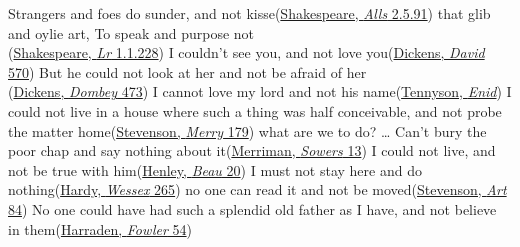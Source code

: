 \ea\label{ex:positive}
 \ea Strangers and foes do sunder, and not kisse\hfill(\href{https://internetshakespeare.uvic.ca/doc/AWW_F1/scene/2.5/index.html#tln-1360}{Shakespeare, \textit{Alls} 2.5.91})
 \ex that glib and oylie art, To speak and purpose not\\\hfill(\href{https://internetshakespeare.uvic.ca/doc/Lr_F1/scene/index.html#tln-245}{Shakespeare, \textit{Lr} 1.1.228})
 \z
\ex \label{ex:negative}
 \ea \label{ex:negative-love} I couldn't see you, and not love you\hfill(\href{https://archive.org/details/personalhistory05dickgoog/page/n249/mode/2up?q=%22couldn%27t+see+you%22&view=theater}{Dickens, \textit{David} 570})
 \ex But he could not look at her and not be afraid of her\\\hfill(\href{https://archive.org/details/dombeyson00dick_0/page/734/mode/2up?q=%22But+he+could+not+look+at+her%22&view=theater}{Dickens, \textit{Dombey} 473}) %
 \ex I cannot love my lord and not his name\hfill(\href{https://archive.org/details/dli.bengal.10689.17599/page/n529/mode/2up?q=%22I+cannot+love+my+lord+and+not+his+name%22&view=theater}{Tennyson, \textit{Enid}})
 \ex I could not live in a house where such a thing was half conceivable, and not probe the matter home\hfill(\href{https://archive.org/details/merrymenothertal00stev/page/166/mode/2up?view=theater&q=%22i+could+not+live+in+a+house%22}{Stevenson, \textit{Merry} 179}) %
 \ex {} what are we to do? {\dots} Can't bury the poor chap and say nothing about it\hfill(\href{https://archive.org/details/sowersnovel00merr/page/10/mode/2up?q=%22what+are+we+to+do%22&view=theater}{Merriman, \textit{Sowers} 13}) %
 \ex I could not live, and not be true with him\hfill(\href{https://archive.org/details/beauaustinadram00stevgoog/page/n36/mode/2up?view=theater&q=%22could+not+live+and+not+be%22}{Henley, \textit{Beau} 20}) %
 \ex{} I must not stay here and do nothing\hfill(\href{https://archive.org/details/dli.bengal.10689.8131/page/n271/mode/2up?q=%22stay+here+and+do+nothing%22&view=theater}{Hardy, \textit{Wessex} 265})
 \ex no one can read it and not be moved\hfill(\href{https://archive.org/details/essaysinartofwri00stevuoft/page/84/mode/2up?view=theater&q=%22no+one+can+read%22}{Stevenson, \textit{Art} 84})
 \ex No one could have had such a splendid old father as I have, and not believe in them\hfill(\href{https://archive.org/details/fowler00harrgoog/page/n62/mode/2up?view=theater&q=%22no+one+could+have+had%22}{Harraden, \textit{Fowler} 54}) %
